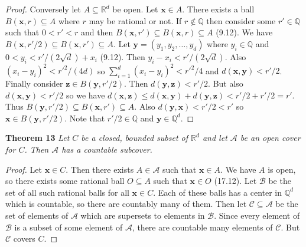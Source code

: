 \documentclass{article}
\begin{document}
\begin{flushleft}
\begin{proof}
Conversely let $A \subseteq \mathbb{R}^d$ be open. Let $\mathbf{x} \in A$. There exists a ball $B(\mathbf{x}, r) \subseteq A$ where $r$ may be rational or not. If $r \notin \mathbb{Q}$ then consider some $r' \in \mathbb{Q}$ such that $0 < r' < r$ and then $B(\mathbf{x}, r') \subseteq B(\mathbf{x}, r) \subseteq A$ (9.12). We have $B(\mathbf{x}, r'/2) \subseteq B(\mathbf{x}, r') \subseteq A$. Let $\mathbf{y} = (y_1, y_2, \dots ,y_d)$ where $y_i \in \mathbb{Q}$ and $0 < y_i < r'/(2\sqrt{d}) + x_i$ (9.12). Then $y_i-x_i < r'/(2\sqrt{d})$. Also $(x_i-y_i)^2 < r'^2/(4d)$ so $\sum_{i=1}^{d} (x_i-y_i)^2 < r'^2/4$ and $d(\mathbf{x}, \mathbf{y}) < r'/2$. Finally consider $\mathbf{z} \in B(\mathbf{y}, r'/2)$. Then $d(\mathbf{y}, \mathbf{z}) < r'/2$. But also $d(\mathbf{x}, \mathbf{y}) < r'/2$ so we have $d(\mathbf{x}, \mathbf{z}) \leq d(\mathbf{x}, \mathbf{y}) + d(\mathbf{y}, \mathbf{z}) < r'/2 + r'/2 = r'$. Thus $B(\mathbf{y}, r'/2) \subseteq B(\mathbf{x}, r') \subseteq A$. Also $d(\mathbf{y}, \mathbf{x}) < r'/2 < r'$ so $\mathbf{x} \in B(\mathbf{y}, r'/2)$. Note that $r'/2 \in \mathbb{Q}$ and $\mathbf{y} \in \mathbb{Q}^d$.
\end{proof}

\textbf{Theorem 13}
\textsl{Let $C$ be a closed, bounded subset of $\mathbb{R}^d$ and let $\mathcal{A}$ be an open cover for $C$. Then $\mathcal{A}$ has a countable subcover.}
\begin{proof}
Let $\mathbf{x} \in C$. Then there exists $A \in \mathcal{A}$ such that $\mathbf{x} \in A$. We have $A$ is open, so there exists some rational ball $O \subseteq A$ such that $\mathbf{x} \in O$ (17.12). Let $\mathcal{B}$ be the set of all such rational balls for all $\mathbf{x} \in C$. Each of these balls has a center in $\mathbb{Q}^d$ which is countable, so there are countably many of them. Then let $\mathcal{C} \subseteq \mathcal{A}$ be the set of elements of $\mathcal{A}$ which are supersets to elements in $\mathcal{B}$. Since every element of $\mathcal{B}$ is a subset of some element of $\mathcal{A}$, there are countable many elements of $\mathcal{C}$. But $\mathcal{C}$ covers $C$.
\end{proof}


\end{flushleft}
\end{document}
